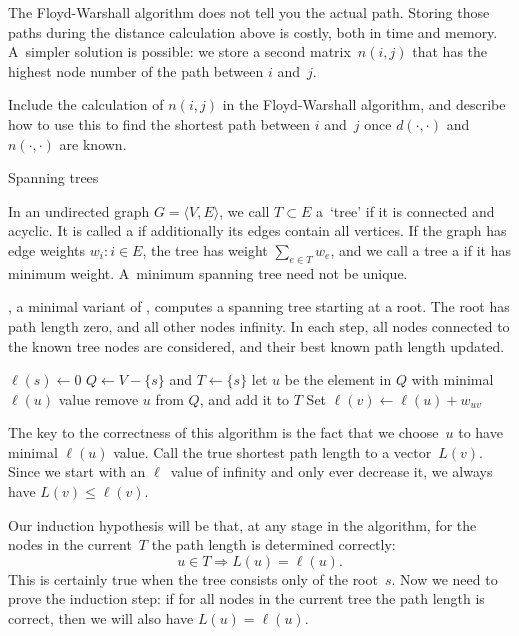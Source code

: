 The Floyd-Warshall algorithm does not tell you the actual
path. Storing those paths during the distance calculation above is
costly, both in time and memory. A~simpler solution is possible: we
store a second matrix~$n(i,j)$ that has the highest node number of the
path between $i$ and~$j$.

\begin{exercise}
  Include the calculation of $n(i,j)$ in the Floyd-Warshall algorithm,
  and describe how to use this to find the shortest path between $i$
  and~$j$ once $d(\cdot,\cdot)$ and $n(\cdot,\cdot)$ are known.
\end{exercise}


 {Spanning trees}

In an undirected graph $G=\langle V,E\rangle$, we call $T\subset E$ a~`tree'
if it is connected and acyclic. It is called a 
if additionally its edges contain all vertices.
If the graph has edge weights
$w_i\colon i\in E$, the tree has weight $\sum_{e\in T} w_e$, and
we call a tree a  if it has minimum weight.
A~minimum spanning tree need not be unique.

, a minimal variant of ,
computes a spanning tree starting at a root. The root has path length zero, and all other nodes
infinity.
In each step, all nodes connected to the known tree nodes are considered, and their best
known path length updated.

\begin{displayalgorithm}
  $\ell(s)\leftarrow 0$\;
  $Q\leftarrow V-\{s\}$ and $T\leftarrow \{s\}$\;
   {
    let $u$ be the element in $Q$ with minimal $\ell(u)$ value\;
    remove $u$ from $Q$, and add it to $T$\;
     {
       {Set $\ell(v)\leftarrow \ell(u)+w_{uv}$}
    }
  }
\end{displayalgorithm}

The key to the correctness of this algorithm is the fact that
we choose~$u$ to have minimal $\ell(u)$ value. Call the true shortest path
length to a vector~$L(v)$. Since we start with an $\ell$~value of infinity and
only ever decrease it, we always have $L(v)\leq\ell(v)$.

Our induction hypothesis will be that, at any stage in the algorithm,
for the nodes in the current~$T$ the path length is determined correctly:
\[ u\in T\Rightarrow L(u)=\ell(u). \]
This is certainly true when the tree consists only of the root~$s$.
Now we need to prove the induction step: if for all nodes in the
current tree the path length is correct, then we will also 
have $L(u)=\ell(u)$. 

